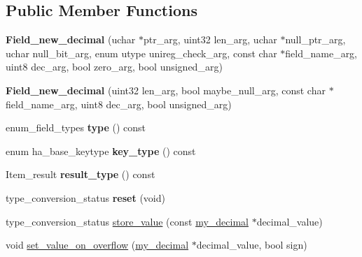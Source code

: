 \subsection*{Public Member Functions}
\begin{DoxyCompactItemize}
\item 
\mbox{\label{classField__new__decimal_a3b31f6824efb6861d0a864bcc69d178a}} 
{\bfseries Field\+\_\+new\+\_\+decimal} (uchar $\ast$ptr\+\_\+arg, uint32 len\+\_\+arg, uchar $\ast$null\+\_\+ptr\+\_\+arg, uchar null\+\_\+bit\+\_\+arg, enum utype unireg\+\_\+check\+\_\+arg, const char $\ast$field\+\_\+name\+\_\+arg, uint8 dec\+\_\+arg, bool zero\+\_\+arg, bool unsigned\+\_\+arg)
\item 
\mbox{\label{classField__new__decimal_a6ec95167cbc0fd26ff47672d26ddc1b3}} 
{\bfseries Field\+\_\+new\+\_\+decimal} (uint32 len\+\_\+arg, bool maybe\+\_\+null\+\_\+arg, const char $\ast$field\+\_\+name\+\_\+arg, uint8 dec\+\_\+arg, bool unsigned\+\_\+arg)
\item 
\mbox{\label{classField__new__decimal_abb26685e90d9925d8900eb48ddff9ceb}} 
enum\+\_\+field\+\_\+types {\bfseries type} () const
\item 
\mbox{\label{classField__new__decimal_a070fe522e587ecd66a7548706c60c4f7}} 
enum ha\+\_\+base\+\_\+keytype {\bfseries key\+\_\+type} () const
\item 
\mbox{\label{classField__new__decimal_a513ddda74da6c87be96779d6b37d086f}} 
Item\+\_\+result {\bfseries result\+\_\+type} () const
\item 
\mbox{\label{classField__new__decimal_a9f84ec4e361dc9eb1502061c8f816d7c}} 
type\+\_\+conversion\+\_\+status {\bfseries reset} (void)
\item 
type\+\_\+conversion\+\_\+status \mbox{\hyperlink{classField__new__decimal_a3d2dd290b995df3f7c8517fe37b6d4ef}{store\+\_\+value}} (const \mbox{\hyperlink{classmy__decimal}{my\+\_\+decimal}} $\ast$decimal\+\_\+value)
\item 
void \mbox{\hyperlink{classField__new__decimal_a731366be6adfc65ab3b325235ff7eede}{set\+\_\+value\+\_\+on\+\_\+overflow}} (\mbox{\hyperlink{classmy__decimal}{my\+\_\+decimal}} $\ast$decimal\+\_\+value, bool sign)

\end{DoxyCompactItemize}
